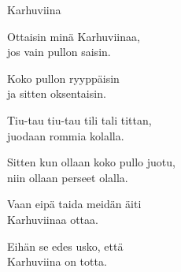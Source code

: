 \begin{song}{Karhuviina}
    

    Ottaisin minä Karhuviinaa,\\
    jos vain pullon saisin.\\
    \begin{repetition}
        Koko pullon ryyppäisin\\
        ja sitten oksentaisin.
    \end{repetition}

    Tiu-tau tiu-tau tili tali tittan,\\
    juodaan rommia kolalla.\\
    \begin{repetition}
        Sitten kun ollaan koko pullo juotu,\\
        niin ollaan perseet olalla.
    \end{repetition}

    Vaan eipä taida meidän äiti\\
    Karhuviinaa ottaa.
    \begin{repetition}
        Eihän se edes usko, että\\
        Karhuviina on totta.
    \end{repetition}

\end{song}